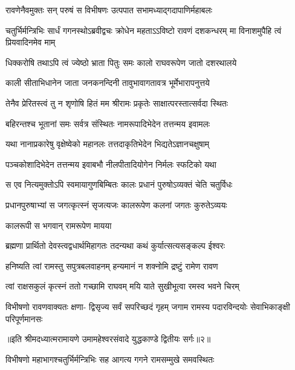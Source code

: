 \twolineshloka
{रावणेनैवमुक्तः सन् परुषं स विभीषणः}
{उत्पपात सभामध्याद्गदापाणिर्महाबलः} %

\threelineshloka
{चतुर्भिर्मन्त्रिभिः सार्धं गगनस्थोऽब्रवीद्वचः}
{क्रोधेन महताऽऽविष्टो रावणं दशकन्धरम्}
{मा विनाशमुपैहि त्वं प्रियवादिनमेव माम्} %

\twolineshloka
{धिक्करोषि तथाऽपि त्वं ज्येष्ठो भ्राता पितुः समः}
{कालो राघवरूपेण जातो दशरथालये} %

\twolineshloka
{काली सीताभिधानेन जाता जनकनन्दिनी}
{तावुभावागतावत्र भूर्मेभारापनुत्तये} %

\twolineshloka
{तेनैव प्रेरितस्त्वं तु न शृणोषि हितं मम}
{श्रीरामः प्रकृतेः साक्षात्परस्तात्सर्वदा स्थितः} %

\twolineshloka
{बहिरन्तश्च भूतानां समः सर्वत्र संस्थितः}
{नामरूपादिभेदेन तत्तन्मय इवामलः} %

\twolineshloka
{यथा नानाप्रकारेषु वृक्षेष्वेको महानलः}
{तत्तदाकृतिभेदेन भिद्यतेऽज्ञानचक्षुषाम्} %

\twolineshloka
{पञ्चकोशादिभेदेन तत्तन्मय इवाबभौ}
{नीलपीतादियोगेन निर्मलः स्फटिको यथा} %

\twolineshloka
{स एव नित्यमुक्तोऽपि स्वमायागुणबिम्बितः}
{कालः प्रधानं पुरुषोऽव्यक्तं चेति चतुर्विधः} %

\twolineshloka
{प्रधानपुरुषाभ्यां स जगत्कृत्स्नं सृजत्यजः}
{कालरूपेण कलनां जगतः कुरुतेऽव्ययः} %

{कालरूपी स भगवान् रामरूपेण मायया} %


\twolineshloka
{ब्रह्मणा प्रार्थितो देवस्त्वद्वधार्थमिहागतः}
{तदन्यथा कथं कुर्यात्सत्यसङ्कल्प ईश्वरः} %

\twolineshloka
{हनिष्यति त्वां रामस्तु सपुत्रबलवाहनम्}
{हन्यमानं न शक्नोमि द्रष्टुं रामेण रावण} %

\twolineshloka
{त्वां राक्षसकुलं कृत्स्नं ततो गच्छामि राघवम्}
{मयि याते सुखीभूत्वा रमस्व भवने चिरम्} %

\fourlineindentedshloka
{विभीषणो रावणवाक्यतः क्षणा-}
{द्विसृज्य सर्वं सपरिच्छदं गृहम्}
{जगाम रामस्य पदारविन्दयोः}
{सेवाभिकाङ्क्षी परिपूर्णमानसः} %

{॥इति श्रीमदध्यात्मरामायणे उमामहेश्वरसंवादे युद्धकाण्डे द्वितीयः
सर्गः॥२॥
}





\twolineshloka
{विभीषणो महाभागश्चतुर्भिर्मन्त्रिभिः सह}
{आगत्य गगने रामसम्मुखे समवस्थितः} %

